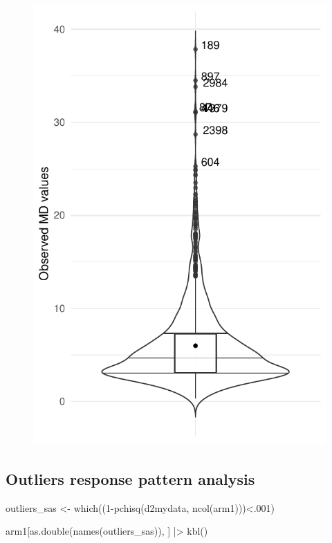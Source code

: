\documentclass[
  letterpaper,
  DIV=11,
  numbers=noendperiod]{scrreprt}
\newenvironment{Shaded}{\begin{snugshade}}{\end{snugshade}}
\newcommand{\DecValTok}[1]{\textcolor[rgb]{0.68,0.00,0.00}{#1}}
\newcommand{\FunctionTok}[1]{\textcolor[rgb]{0.28,0.35,0.67}{#1}}
\newcommand{\NormalTok}[1]{\textcolor[rgb]{0.00,0.23,0.31}{#1}}
\newcommand{\OtherTok}[1]{\textcolor[rgb]{0.00,0.23,0.31}{#1}}
\newcommand{\SpecialCharTok}[1]{\textcolor[rgb]{0.37,0.37,0.37}{#1}}
\begin{document}
\begin{figure}[H]

{\centering \includegraphics{02_data-screening_files/figure-pdf/md-distribution-1.pdf}

}

\end{figure}

\hypertarget{outliers-response-pattern-analysis}{%
\subsection{Outliers response pattern
analysis}\label{outliers-response-pattern-analysis}}

\begin{Shaded}
\begin{Highlighting}[]
\NormalTok{outliers\_sas }\OtherTok{\textless{}{-}}  \FunctionTok{which}\NormalTok{((}\DecValTok{1}\SpecialCharTok{{-}}\FunctionTok{pchisq}\NormalTok{(d2mydata, }\FunctionTok{ncol}\NormalTok{(arm1)))}\SpecialCharTok{\textless{}}\NormalTok{.}\DecValTok{001}\NormalTok{)}

\NormalTok{arm1[}\FunctionTok{as.double}\NormalTok{(}\FunctionTok{names}\NormalTok{(outliers\_sas)), ] }\SpecialCharTok{|\textgreater{}} 
  \FunctionTok{kbl}\NormalTok{()}
\end{Highlighting}
\end{Shaded}
\end{document}
